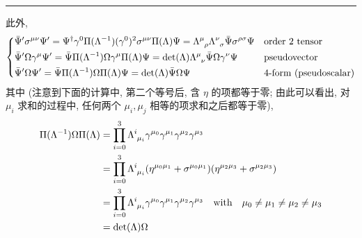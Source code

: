 \begin{itemize}
\begin{tcolorbox}[title=calculation:]
		\noindent\rule[0.5ex]{\linewidth}{0.5pt} %
		
		此外,
		\begin{equation} \label{6.2.23}
			\begin{dcases}
				\bar{\Psi}' \sigma^{\mu \nu} \Psi' = \Psi^\dag \gamma^0 \Pi(\Lambda^{- 1}) (\gamma^0)^2 \sigma^{\mu \nu} \Pi(\Lambda) \Psi = \tensor{\Lambda}{^\mu_\rho} \tensor{\Lambda}{^\nu_\sigma} \bar{\Psi} \sigma^{\rho \sigma} \Psi & \text{order 2 tensor} \\
				\bar{\Psi}' \Omega \gamma^\mu \Psi' = \bar{\Psi} \Pi(\Lambda^{- 1}) \Omega \gamma^\mu \Pi(\Lambda) \Psi = \det(\Lambda) \tensor{\Lambda}{^\mu_\nu} \bar{\Psi} \Omega \gamma^\nu \Psi & \text{pseudovector} \\
				\bar{\Psi}' \Omega \Psi' = \bar{\Psi} \Pi(\Lambda^{- 1}) \Omega \Pi(\Lambda) \Psi = \det(\Lambda) \bar{\Psi} \Omega \Psi & \text{4-form (pseudoscalar)}
			\end{dcases}
		\end{equation}
		其中 (注意到下面的计算中, 第二个等号后, 含 $\eta$ 的项都等于零; 由此可以看出, 对 $\mu_i$ 求和的过程中, 任何两个 $\mu_i, \mu_j$ 相等的项求和之后都等于零),
		\begin{align}
			\Pi(\Lambda^{- 1}) \Omega \Pi(\Lambda) &= \prod_{i = 0}^3 \tensor{\Lambda}{^i_{\mu_i}} \gamma^{\mu_0} \gamma^{\mu_1} \gamma^{\mu_2} \gamma^{\mu_3} \notag \\
			&= \prod_{i = 0}^3 \tensor{\Lambda}{^i_{\mu_i}} (\eta^{\mu_0 \mu_1} + \sigma^{\mu_0 \mu_1}) (\eta^{\mu_2 \mu_3} + \sigma^{\mu_2 \mu_3}) \notag \\
			&= \prod_{i = 0}^3 \tensor{\Lambda}{^i_{\mu_i}} \gamma^{\mu_0} \gamma^{\mu_1} \gamma^{\mu_2} \gamma^{\mu_3} \quad \text{with} \quad \mu_0 \neq \mu_1 \neq \mu_2 \neq \mu_3 \notag \\
			&= \det(\Lambda) \Omega
		\end{align}
	\end{tcolorbox}
\end{itemize}

